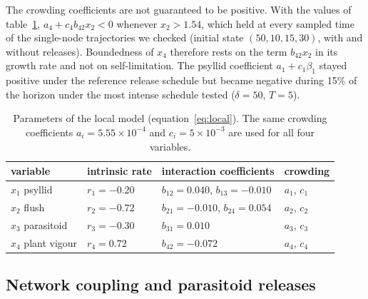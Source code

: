 The crowding coefficients are not guaranteed to be positive. With the values of table~\ref{tab:params}, $a_4 + c_4 b_{42}x_2 < 0$ whenever $x_2 > 1.54$, which held at every sampled time of the single-node trajectories we checked (initial state $(50,10,15,30)$, with and without releases). Boundedness of $x_4$ therefore rests on the term $b_{42}x_2$ in its growth rate and not on self-limitation. The psyllid coefficient $a_1 + c_1\beta_1$ stayed positive under the reference release schedule but became negative during 15\% of the horizon under the most intense schedule tested ($\delta=50$, $T=5$).

\begin{table}[t]
\centering
\caption{Parameters of the local model (equation~\eqref{eq:local}). The same crowding coefficients $a_i = 5.55\times10^{-4}$ and $c_i = 5\times10^{-3}$ are used for all four variables.}
\label{tab:params}
\small
\begin{tabular}{llll}
\toprule
variable & intrinsic rate & interaction coefficients & crowding \\
\midrule
$x_1$ psyllid     & $r_1=-0.20$ & $b_{12}=0.040$, $b_{13}=-0.010$ & $a_1$, $c_1$\\
$x_2$ flush       & $r_2=-0.72$ & $b_{21}=-0.010$, $b_{24}=0.054$ & $a_2$, $c_2$\\
$x_3$ parasitoid  & $r_3=-0.30$ & $b_{31}=0.010$                  & $a_3$, $c_3$\\
$x_4$ plant vigour& $r_4=0.72$  & $b_{42}=-0.072$                 & $a_4$, $c_4$\\
\bottomrule
\end{tabular}
\end{table}

\subsection{Network coupling and parasitoid releases}
\label{sec:network}

